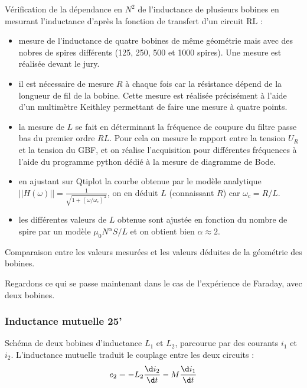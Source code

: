 \begin{experience}
Vérification de la dépendance en $N^2$ de l'inductance de plusieurs bobines en mesurant l'inductance d'après la fonction de transfert d'un circuit RL :
\begin{itemize}
\item mesure de l'inductance de quatre bobines de même géométrie mais avec des nobres de spires différents (125, 250, 500 et 1000 spires).
Une mesure est réalisée devant le jury.
\item il est nécessaire de mesure $R$ à chaque fois car la résistance dépend de la longueur de fil de la bobine. Cette mesure est réalisée précisément à l'aide d'un multimètre Keithley permettant de faire une mesure à quatre points.
\item la mesure de $L$ se fait en déterminant la fréquence de coupure du filtre passe bas du premier ordre $RL$.
Pour cela on mesure le rapport entre la tension $U_R$ et la tension du GBF, et on réalise l'acquisition pour différentes fréquences à l'aide du programme python dédié à la mesure de diagramme de Bode.
\item en ajustant sur Qtiplot la courbe obtenue par le modèle analytique $||H(\omega)|| = \frac{1}{\sqrt{1+(\omega/\omega_c)^2}}$, on en déduit $L$ (connaissant $R$) car $\omega_c = R/L$.
\item les différentes valeurs de $L$ obtenue sont ajustée en fonction du nombre de spire par un modèle $\mu_0N^\alpha S/L$ et on obtient bien $\alpha\approx2$.
\end{itemize}
Comparaison entre les valeurs mesurées et les valeurs déduites de la géométrie des bobines.
\end{experience}

\begin{transition}
Regardons ce qui se passe maintenant dans le cas de l'expérience de Faraday, avec deux bobines.
\end{transition}

\subsubsection{Inductance mutuelle 25'}

Schéma de deux bobines d'inductance $L_1$ et $L_2$, parcourue par des courants $i_1$ et $i_2$.
L'inductance mutuelle traduit le couplage entre les deux circuits :
\begin{equation}
e_2 = -L_2\frac{\d i_2}{\d t} - M\frac{\d i_1}{\d t}
\end{equation}

